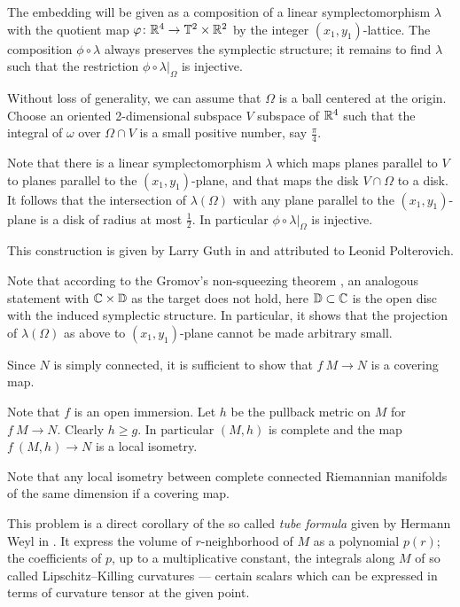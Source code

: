 The embedding will be given as a composition of a linear symplectomorphism $\lambda$ 
with the quotient map $\varphi\colon\mathbb{R}^4\to \mathbb{T}^2\times\mathbb{R}^2$ by the integer $(x_1,y_1)$-lattice.
The composition $\phi\circ\lambda$ always preserves the symplectic structure;
it remains to find $\lambda$ such that the restriction $\phi\circ\lambda|_\Omega$
is injective.

Without loss of generality,
we can assume that $\Omega$ is a ball centered at the origin.
Choose an oriented 2-dimensional subspace $V$ subspace of $\mathbb{R}^4$ 
such that the integral of $\omega$ over 
$\Omega\cap V$ is a small positive number, say $\tfrac\pi4$. 

Note that there is a linear symplectomorphism $\lambda$
 which maps planes parallel to $V$ to planes
parallel to the $(x_1,y_1)$-plane, 
and that maps the disk $V\cap\Omega$ to a disk.
It follows that the intersection of $\lambda(\Omega)$ 
with any plane parallel to the $(x_1,y_1)$-plane is a disk of radius at most $\tfrac 12$.
In particular $\phi\circ\lambda|_\Omega$
is injective.\qeds

This construction is given 
by Larry Guth in \cite{guth-symplectic}
and attributed to Leonid Polterovich.

Note that according to the Gromov's non-squeezing theorem \cite[see][]{gromov-pseudoholomorphic}, 
an analogous statement with $\mathbb{C}\times \mathbb{D}$ as the target does not hold, here $\mathbb{D}\subset \mathbb{C}$ is the open disc with the induced symplectic structure.
In particular, it shows that
the projection of $\lambda(\Omega)$ as above 
to $(x_1,y_1)$-plane
cannot be made arbitrary small.

Since $N$ is simply connected, 
it is sufficient to show that $f\:M\to N$ is a covering map.

Note that $f$ is an open immersion.
Let $h$ be the pullback metric on $M$ for $f\:M\to N$.
Clearly $h\ge g$.
In particular $(M,h)$ is complete and the map $f\:(M,h)\to N$ is a local isometry. 

Note that any local isometry between complete connected Riemannian manifolds of the same dimension if a covering map.
\qeds 


This problem is a direct corollary of the so called \emph{tube formula} given by Hermann Weyl in \cite{weyl}.
It express the volume of $r$-neighborhood of $M$ as a polynomial $p(r)$;
the coefficients of $p$, up to a multiplicative constant, the integrals along $M$ of so called Lipschitz--Killing curvatures --- certain scalars which can be expressed in terms of curvature tensor at the given point.
 

